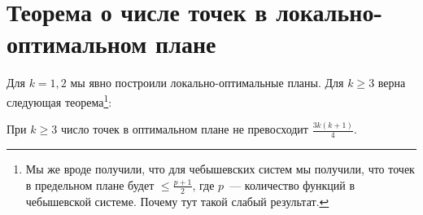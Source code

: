 \section{Теорема о числе точек в локально-оптимальном плане}

Для $k=1,2$ мы явно построили локально-оптимальные планы. Для $k\geq 3$ верна следующая теорема\footnote{Мы же вроде получили, что для чебышевских систем мы получили, что точек в предельном плане будет $\leq \frac{p+1}{2}$, где $p$ — количество функций в чебышевской системе. Почему тут такой слабый результат.}:

\begin{thm}
При $k \geq 3$ число точек в оптимальном плане не превосходит $\frac{3k(k+1)}{4}$.
\end{thm}
 
